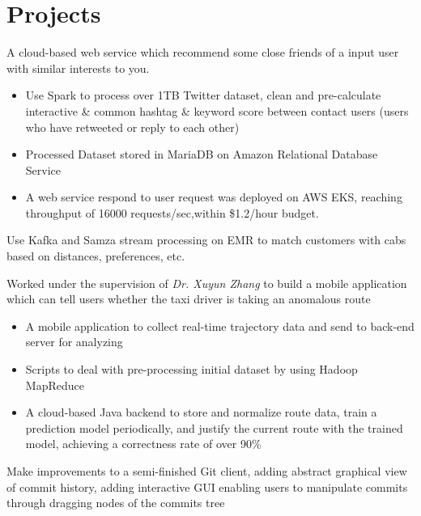 \documentclass{resume}
\begin{document}
\section{Projects}
\begin{flushleft}

A cloud-based web service which recommend some close friends of a input user with similar interests to you.
\begin{itemize}
    \item Use Spark to process over 1TB Twitter dataset, clean and pre-calculate interactive \& common hashtag \linebreak \& keyword score between contact users (users who have retweeted or reply to each other)
    \item Processed Dataset stored in MariaDB on Amazon Relational Database Service
    \item A web service respond to user request was deployed on AWS EKS, reaching throughput of 16000 requests/sec,\linebreak within \$1.2/hour budget.
\end{itemize}

Use Kafka and Samza stream processing on EMR to match customers with cabs based on distances, preferences, etc.

Worked under the supervision of \textit{Dr. Xuyun Zhang} to build a mobile application which can tell users whether \linebreak the taxi driver is taking an anomalous route
\begin{itemize}
    \item A mobile application to collect real-time trajectory data and send to back-end server for analyzing
    \item Scripts to deal with pre-processing initial dataset by using Hadoop MapReduce
    \item A cloud-based Java backend to store and normalize route data, train a prediction model periodically, \linebreak and justify the current route with the trained model, achieving a correctness rate of over 90\%
\end{itemize}

Make improvements to a semi-finished Git client, adding abstract graphical view of commit history, adding interactive GUI enabling users to manipulate commits through dragging nodes of the commits tree
\end{flushleft}
\end{document}
